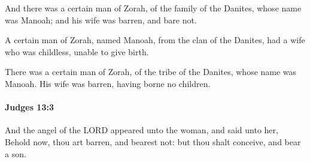 			\begin{versebox}
					\item[BHS] 
					\item[ASV] And there was a certain man of Zorah, of the family of the Danites, whose name was Manoah; and his wife was barren, and bare not.
					\item[NIV] A certain man of Zorah, named Manoah, from the clan of the Danites, had a wife who was childless, unable to give birth.
					\item[NRSV] There was a certain man of Zorah, of the tribe of the Danites, whose name was Manoah. His wife was barren, having borne no children.
			\end{versebox}

		\paragraph{Judges 13:3} %
			\label{JUDGES-13-3}

			And the angel of the LORD appeared unto the woman, and said unto her, Behold now, thou art barren, and bearest not: but thou shalt conceive, and bear a son.

